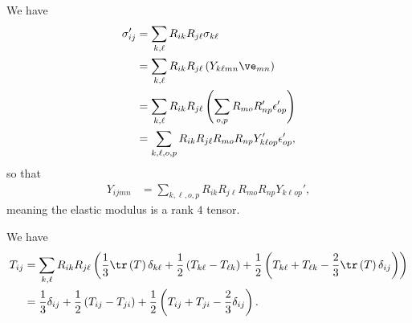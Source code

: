 \documentclass[10pt]{mypackage}
\begin{document}
\begin{solution}[29.14]
  We have
  \begin{align*}
    \sigma_{ij}' &= \sum_{k,\ell}R_{ik}R_{j\ell}\sigma_{k\ell}\\
                 &= \sum_{k,\ell} R_{ik}R_{j\ell}\left( Y_{k\ell mn}\ve_{mn} \right)\\
                 &= \sum_{k,\ell}R_{ik}R_{j\ell}\left( \sum_{o,p}R_{mo}R_{np}'\epsilon_{op}' \right)\\
                 &= \sum_{k,\ell,o,p}R_{ik}R_{j\ell}R_{mo}R_{np} Y_{k\ell o p}'\epsilon_{op}',
  \end{align*}
  so that
  \begin{align*}
    Y_{ijmn} &= \sum_{k,\ell,o,p}R_{ik}R_{j\ell}R_{mo}R_{np}Y_{k\ell op}',
  \end{align*}
  meaning the elastic modulus is a rank $4$ tensor.
\end{solution}
\begin{solution}[29.23]
  We have
  \begin{align*}
    T_{ij} &= \sum_{k,\ell}R_{i k}R_{j\ell}\left( \frac{1}{3}\tr\left( T \right)\delta_{k \ell} + \frac{1}{2}\left( T_{k \ell} - T_{\ell k}  \right) + \frac{1}{2}\left( T_{k\ell} + T_{\ell k} - \frac{2}{3}\tr\left( T \right)\delta_{ij} \right) \right)\\
           &= \frac{1}{3}\delta_{ij} + \frac{1}{2}\left( T_{ij} - T_{ji} \right) + \frac{1}{2}\left( T_{ij} + T_{ji} - \frac{2}{3}\delta_{ij} \right).
  \end{align*}
\end{solution}
\end{document}
